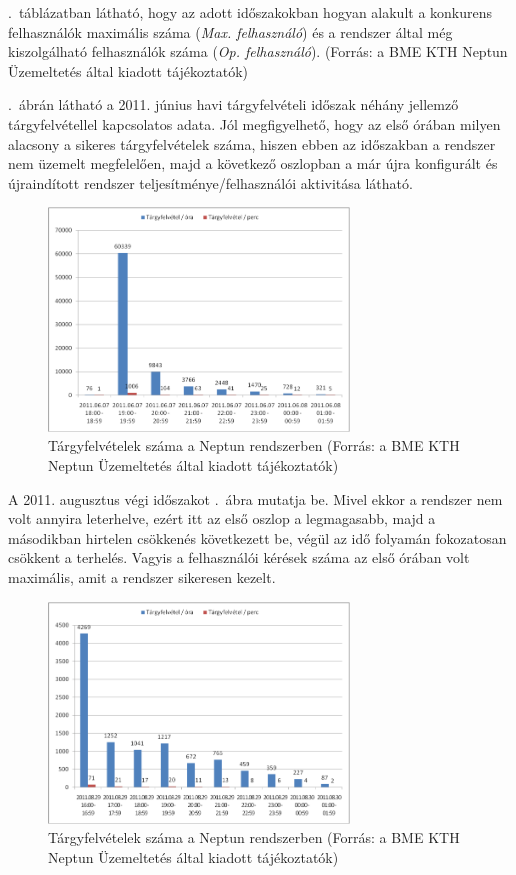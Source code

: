 

.~táblázatban látható, hogy az adott időszakokban hogyan alakult a konkurens felhasználók maximális száma (\textit{Max. felhasználó}) és a rendszer által még kiszolgálható felhasználók száma (\textit{Op. felhasználó}). (Forrás: a BME KTH Neptun Üzemeltetés által kiadott tájékoztatók)


.~ábrán látható a 2011. június havi tárgyfelvételi időszak néhány jellemző tárgyfelvétellel kapcsolatos adata. Jól megfigyelhető, hogy az első órában milyen alacsony a sikeres tárgyfelvételek száma, hiszen ebben az időszakban a rendszer nem üzemelt megfelelően, majd a következő oszlopban a már újra konfigurált és újraindított rendszer teljesítménye/felhasználói aktivitása látható.

\begin{figure}[!ht]
\centering
\includegraphics[width=80mm, keepaspectratio]{figures/neptun_003.png}
\caption{Tárgyfelvételek száma a Neptun rendszerben (Forrás: a BME KTH Neptun Üzemeltetés által kiadott tájékoztatók)}
\label{fig:neptun_003}
\end{figure}

A 2011. augusztus végi időszakot .~ábra mutatja be. Mivel ekkor a rendszer nem volt annyira leterhelve, ezért itt az első oszlop a legmagasabb, majd a másodikban hirtelen csökkenés következett be, végül az idő folyamán fokozatosan csökkent a terhelés. Vagyis a felhasználói kérések száma az első órában volt maximális, amit a rendszer sikeresen kezelt. 

\begin{figure}[!h]
\centering
\includegraphics[width=80mm, keepaspectratio]{figures/neptun_004.png}
\caption{Tárgyfelvételek száma a Neptun rendszerben (Forrás: a BME KTH Neptun Üzemeltetés által kiadott tájékoztatók)}
\label{fig:neptun_004}
\end{figure}

